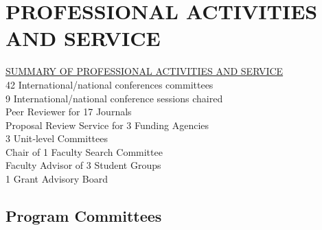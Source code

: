 \documentclass[11pt,letterpaper,sans]{moderncv}
\begin{document}
\section{PROFESSIONAL ACTIVITIES AND SERVICE}

\begin{framed}
  \underline{SUMMARY OF PROFESSIONAL ACTIVITIES AND SERVICE} \\
  42 International/national conferences committees \\
  9 International/national conference sessions chaired \\
  Peer Reviewer for 17 Journals \\
  Proposal Review Service for 3 Funding Agencies \\
  3 Unit‐level Committees \\
  Chair of 1 Faculty Search Committee \\
  Faculty Advisor of 3 Student Groups  \\
  1 Grant Advisory Board \\
\end{framed}

\subsection{Program Committees}
\end{document}
